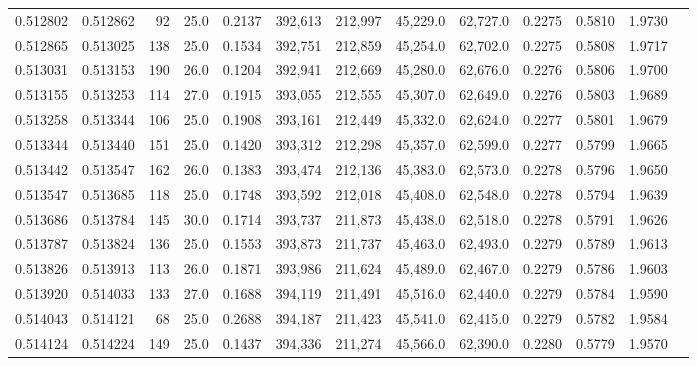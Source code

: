 \begin{tabular}{rrrrrrrrrrrrr}
0.512802 & 0.512862 &    92 & 25.0 &                                     0.2137 & 392,613 & 212,997 &  45,229.0 &  62,727.0 & 0.2275 & 0.5810 & 1.9730 \\
0.512865 & 0.513025 &   138 & 25.0 &                                     0.1534 & 392,751 & 212,859 &  45,254.0 &  62,702.0 & 0.2275 & 0.5808 & 1.9717 \\
0.513031 & 0.513153 &   190 & 26.0 &                                     0.1204 & 392,941 & 212,669 &  45,280.0 &  62,676.0 & 0.2276 & 0.5806 & 1.9700 \\
0.513155 & 0.513253 &   114 & 27.0 &                                     0.1915 & 393,055 & 212,555 &  45,307.0 &  62,649.0 & 0.2276 & 0.5803 & 1.9689 \\
0.513258 & 0.513344 &   106 & 25.0 &                                     0.1908 & 393,161 & 212,449 &  45,332.0 &  62,624.0 & 0.2277 & 0.5801 & 1.9679 \\
0.513344 & 0.513440 &   151 & 25.0 &                                     0.1420 & 393,312 & 212,298 &  45,357.0 &  62,599.0 & 0.2277 & 0.5799 & 1.9665 \\
0.513442 & 0.513547 &   162 & 26.0 &                                     0.1383 & 393,474 & 212,136 &  45,383.0 &  62,573.0 & 0.2278 & 0.5796 & 1.9650 \\
0.513547 & 0.513685 &   118 & 25.0 &                                     0.1748 & 393,592 & 212,018 &  45,408.0 &  62,548.0 & 0.2278 & 0.5794 & 1.9639 \\
0.513686 & 0.513784 &   145 & 30.0 &                                     0.1714 & 393,737 & 211,873 &  45,438.0 &  62,518.0 & 0.2278 & 0.5791 & 1.9626 \\
0.513787 & 0.513824 &   136 & 25.0 &                                     0.1553 & 393,873 & 211,737 &  45,463.0 &  62,493.0 & 0.2279 & 0.5789 & 1.9613 \\
0.513826 & 0.513913 &   113 & 26.0 &                                     0.1871 & 393,986 & 211,624 &  45,489.0 &  62,467.0 & 0.2279 & 0.5786 & 1.9603 \\
0.513920 & 0.514033 &   133 & 27.0 &                                     0.1688 & 394,119 & 211,491 &  45,516.0 &  62,440.0 & 0.2279 & 0.5784 & 1.9590 \\
0.514043 & 0.514121 &    68 & 25.0 &                                     0.2688 & 394,187 & 211,423 &  45,541.0 &  62,415.0 & 0.2279 & 0.5782 & 1.9584 \\
0.514124 & 0.514224 &   149 & 25.0 &                                     0.1437 & 394,336 & 211,274 &  45,566.0 &  62,390.0 & 0.2280 & 0.5779 & 1.9570 \\

\end{tabular}

